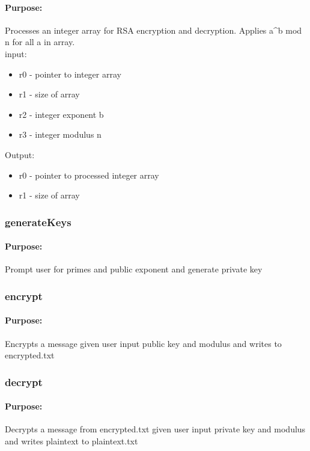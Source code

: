 \documentclass{article}
\begin{document}
            \paragraph*{Purpose:}
                {Processes an integer array for RSA encryption and decryption. Applies a\^{}b mod n for all a in array. \\}
                input:\begin{itemize}
                    \item r0 - pointer to integer array
                    \item r1 - size of array
                    \item r2 - integer exponent b
                    \item r3 - integer modulus n
                \end{itemize}
                Output:\begin{itemize}
                    \item r0 - pointer to processed integer array
                    \item r1 - size of array
                \end{itemize}

        \subsubsection{generateKeys}
            \paragraph*{Purpose:}
                {Prompt user for primes and public exponent and generate private key \\}

        \subsubsection{encrypt}
            \paragraph*{Purpose:}
                {Encrypts a message given user input public key and modulus and writes to encrypted.txt \\}
        \subsubsection{decrypt}
            \paragraph*{Purpose:}
                {Decrypts a message from encrypted.txt given user input private key and modulus and writes plaintext to plaintext.txt\\}
        
\end{document}
